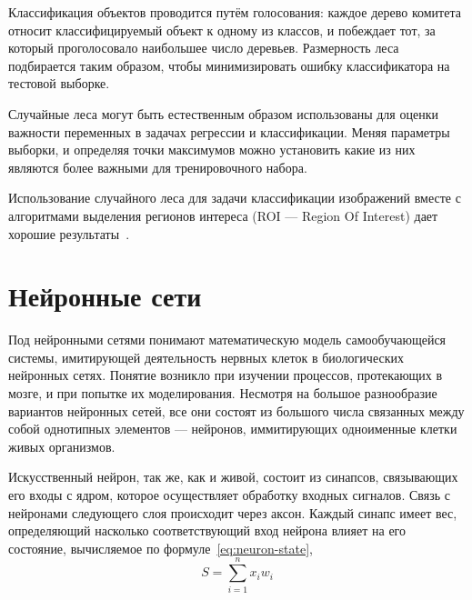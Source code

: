 \documentclass[a4paper,14pt]{extarticle} %
\begin{document}
Классификация объектов проводится путём голосования: каждое дерево комитета относит классифицируемый объект к одному из классов, и побеждает тот, за который проголосовало наибольшее число деревьев. Размерность леса подбирается таким образом, чтобы минимизировать ошибку классификатора на тестовой выборке. 

Случайные леса могут быть естественным образом использованы для оценки важности переменных в задачах регрессии и классификации. Меняя параметры выборки, и определяя точки максимумов можно установить какие из них являются более важными для тренировочного набора. 

Использование случайного леса для задачи классификации изображений вместе с алгоритмами выделения регионов интереса (ROI --- Region Of Interest) дает хорошие результаты~\cite{bosch2007image}.

\newpage

\section{Нейронные сети}
\hspace{\parindent} Под нейронными сетями понимают математическую модель самообучающейся системы, имитирующей деятельность нервных клеток в биологических нейронных сетях. Понятие возникло при изучении процессов, протекающих в мозге, и при попытке их моделирования. Несмотря на большое разнообразие вариантов нейронных сетей, все они состоят из большого числа связанных между собой однотипных элементов --- нейронов, иммитирующих одноименные клетки живых организмов.

Искусственный нейрон, так же, как и живой, состоит из синапсов, связывающих его входы с ядром, которое осуществляет обработку входных сигналов. Связь с нейронами следующего слоя происходит через аксон. Каждый синапс имеет вес, определяющий насколько соответствующий вход нейрона влияет на его состояние, вычисляемое по формуле~\ref{eq:neuron-state}, 
\begin{equation}
S = \sum_{i=1}^{n}x_iw_i
\label{eq:neuron-state}
\end{equation} 
\end{document}
